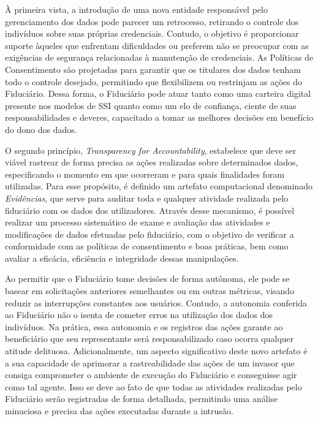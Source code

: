 À primeira vista, a introdução de uma nova entidade responsável pelo gerenciamento dos dados pode parecer um retrocesso, retirando o controle dos indivíduos sobre suas próprias credenciais. Contudo, o objetivo é proporcionar suporte àqueles que enfrentam dificuldades ou preferem não se preocupar com as exigências de segurança relacionadas à manutenção de credenciais. As Políticas de Consentimento são projetadas para garantir que os titulares dos dados tenham todo o controle desejado, permitindo que flexibilizem ou restrinjam as ações do Fiduciário. Dessa forma, o Fiduciário pode atuar tanto como uma carteira digital presente nos modelos de \acs{SSI} quanto como um elo de confiança, ciente de suas responsabilidades e deveres, capacitado a tomar as melhores decisões em benefício do dono dos dados.

O segundo princípio, \emph{Transparency for Accountability}, estabelece que deve ser viável rastrear de forma precisa as ações realizadas sobre determinados dados, especificando o momento em que ocorreram e para quais finalidades foram utilizadas. Para esse propósito, é definido um artefato computacional denominado \emph{Evidências}, que serve para auditar toda e qualquer atividade realizada pelo fiduciário com os dados dos utilizadores. Através desse mecanismo, é possível realizar um processo sistemático de exame e avaliação das atividades e modificações de dados efetuadas pelo fiduciário, com o objetivo de verificar a conformidade com as políticas de consentimento e boas práticas, bem como avaliar a eficácia, eficiência e integridade dessas manipulações.

Ao permitir que o Fiduciário tome decisões de forma autônoma, ele pode se basear em solicitações anteriores semelhantes ou em outras métricas, visando reduzir as interrupções constantes aos usuários. Contudo, a autonomia conferida ao Fiduciário não o isenta de cometer erros na utilização dos dados dos indivíduos. Na prática, essa autonomia e os registros das ações garante ao beneficiário que seu representante será responsabilizado caso ocorra qualquer atitude delituosa. Adicionalmente, um aspecto significativo deste novo artefato é a sua capacidade de aprimorar a rastreabilidade das ações de um invasor que consiga comprometer o ambiente de execução do Fiduciário e conseguisse agir como tal agente. Isso se deve ao fato de que todas as atividades realizadas pelo Fiduciário serão registradas de forma detalhada, permitindo uma análise minuciosa e precisa das ações executadas durante a intrusão.

